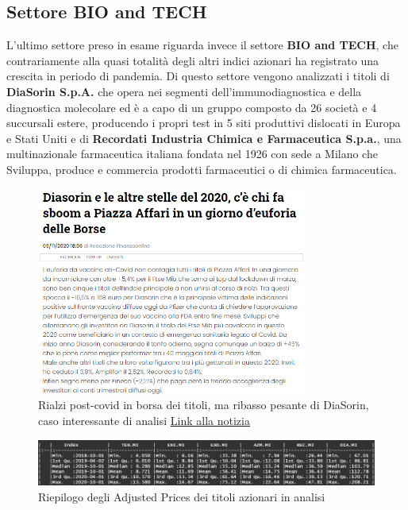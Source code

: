 \documentclass[12pt]{article}
\begin{document}
\subsection{Settore BIO and TECH}
L'ultimo settore preso in esame riguarda invece il settore \textbf{BIO and TECH}, che contrariamente alla quasi totalità degli altri indici azionari ha registrato una crescita in periodo di pandemia. Di questo settore vengono analizzati i titoli di \textbf{DiaSorin S.p.A.} che opera nei segmenti dell'immunodiagnostica e della diagnostica molecolare ed è a capo di un gruppo composto da 26 società e 4 succursali estere, producendo i propri test in 5 siti produttivi dislocati in Europa e Stati Uniti e di \textbf{Recordati Industria Chimica e Farmaceutica S.p.a.}, una multinazionale farmaceutica italiana fondata nel 1926 con sede a Milano che Sviluppa, produce e commercia prodotti farmaceutici o di chimica farmaceutica.
\begin{figure}[!htb]
    \centering
    \includegraphics[width=0.8\textwidth]{immagini/dia.png}
    \caption{Rialzi post-covid in borsa dei titoli, ma ribasso pesante di DiaSorin, caso interessante di analisi  \href{https://www.finanzaonline.com/notizie/diasorin-e-le-altre-ecco-chi-fa-sboom-a-piazza-affari-inwit-amplifon-recordati}{Link alla notizia}}
\end{figure}
\FloatBarrier

\begin{figure}[!htb]
    \centering
    \includegraphics[width=1\textwidth]{immagini/riepilogo.png}
    \caption{Riepilogo degli Adjusted Prices dei titoli azionari in analisi}
\end{figure}
\FloatBarrier
\newpage
\end{document}

